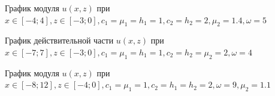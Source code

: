 \documentclass[a4paper, 12pt]{article}
\begin{document}
            \begin{figure}[h!]
                \noindent{}
                \caption{График модуля $u(x,z)$ при $x \in [-4;4], z \in [-3;0], c_1=\mu_1=h_1=1, c_2=h_2=2, \mu_2=1.4, \omega =5$}
                \label{figCurves}
                \end{figure}

    \begin{figure}[h!]
    \noindent{}
    \caption{График действительной части $u(x,z)$ при $x \in [-7;7], z \in [-3;0], c_1=\mu_1=h_1=1, c_2=h_2=\mu_2=2, \omega =4$}
    \label{figCurves}
    \end{figure}  

    \begin{figure}[h!]
        \noindent{}
        \caption{График модуля $u(x,z)$ при $x \in [-8;12], z \in [-4;0], c_1=\mu_1=1, c_2=h_1=h_2=2, \omega =9, \mu_2=1.1$}
        \label{figCurves}
        \end{figure} 
\end{document}
